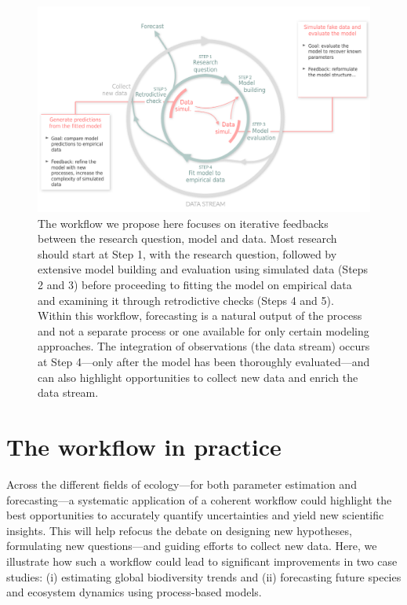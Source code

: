 \documentclass[11pt]{article}
\newcommand{\llabel}[1]{\hypertarget{lintarget:#1}{}\linelabel{lin:#1}}
\begin{document}
\begin{figure}[h]
	\centering
	\vspace*{-0.1cm}
    \hspace*{-1.5cm}
	\includegraphics{../figures/figure_worflow_wsteps}
	\caption{The workflow we propose here \citep[which builds from recent advances in workflows,][]{betanworkflow,Gelman2020,Schad2020,grinsztajn2021,vandeschoot2021,Wolkovich2024} focuses on iterative feedbacks between the research question, model and data. Most research should start at Step 1, with the research question, followed by extensive model building and evaluation using simulated data (Steps 2 and 3) before proceeding to fitting the model on empirical data and examining it through retrodictive checks (Steps 4 and 5). Within this workflow, forecasting is a natural output of the process and not a separate process or one available for only certain modeling approaches.  The integration of observations (the data stream) occurs at Step 4---only after the model has been thoroughly evaluated---and can also highlight opportunities to collect new data and enrich the data stream.}
	\vspace*{-0.5cm}
	\label{fig:workflow}
\end{figure}

\section{The workflow in practice}

Across the different fields of ecology---for both parameter estimation and forecasting---a systematic application of a coherent workflow could highlight the best opportunities to accurately \llabel{quant1}quantify uncertainties and yield new scientific insights. This will help refocus the debate on designing new hypotheses, formulating new questions---and guiding efforts to collect new data. Here, we illustrate how such a workflow could lead to significant improvements in two case studies: (i) estimating global biodiversity trends and (ii) forecasting future species and ecosystem dynamics using process-based models.
\end{document}
